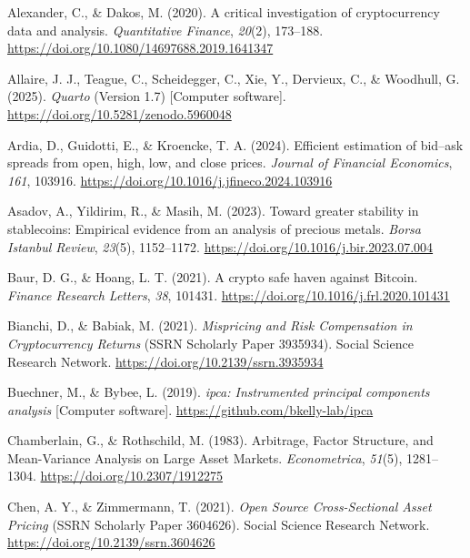 \documentclass[
  12pt,
  a4paper,
  openany]{scrbook}
\newlength{\cslhangindent}
\newenvironment{CSLReferences}[2] %
 {\begin{list}{}{%
  \setlength{\itemindent}{0pt}
  \setlength{\leftmargin}{0pt}
  \setlength{\parsep}{0pt}
  \ifodd #1
   \setlength{\leftmargin}{\cslhangindent}
   \setlength{\itemindent}{-1\cslhangindent}
  \fi
  \setlength{\itemsep}{#2\baselineskip}}}
 {\end{list}}
\begin{document}
\label{refs}
\begin{CSLReferences}{1}{0}
Alexander, C., \& Dakos, M. (2020). A critical investigation of
cryptocurrency data and analysis. \emph{Quantitative Finance},
\emph{20}(2), 173--188.
\url{https://doi.org/10.1080/14697688.2019.1641347}

Allaire, J. J., Teague, C., Scheidegger, C., Xie, Y., Dervieux, C., \&
Woodhull, G. (2025). \emph{{Quarto}} (Version 1.7) {[}Computer
software{]}. \url{https://doi.org/10.5281/zenodo.5960048}

Ardia, D., Guidotti, E., \& Kroencke, T. A. (2024). Efficient estimation
of bid--ask spreads from open, high, low, and close prices.
\emph{Journal of Financial Economics}, \emph{161}, 103916.
\url{https://doi.org/10.1016/j.jfineco.2024.103916}

Asadov, A., Yildirim, R., \& Masih, M. (2023). Toward greater stability
in stablecoins: Empirical evidence from an analysis of precious metals.
\emph{Borsa Istanbul Review}, \emph{23}(5), 1152--1172.
\url{https://doi.org/10.1016/j.bir.2023.07.004}

Baur, D. G., \& Hoang, L. T. (2021). A crypto safe haven against
Bitcoin. \emph{Finance Research Letters}, \emph{38}, 101431.
\url{https://doi.org/10.1016/j.frl.2020.101431}

Bianchi, D., \& Babiak, M. (2021). \emph{Mispricing and Risk
Compensation in Cryptocurrency Returns} (SSRN Scholarly Paper 3935934).
Social Science Research Network.
\url{https://doi.org/10.2139/ssrn.3935934}

Buechner, M., \& Bybee, L. (2019). \emph{{ipca}: Instrumented principal
components analysis} {[}Computer software{]}.
\url{https://github.com/bkelly-lab/ipca}

Chamberlain, G., \& Rothschild, M. (1983). Arbitrage, Factor Structure,
and Mean-Variance Analysis on Large Asset Markets. \emph{Econometrica},
\emph{51}(5), 1281--1304. \url{https://doi.org/10.2307/1912275}

Chen, A. Y., \& Zimmermann, T. (2021). \emph{Open Source Cross-Sectional
Asset Pricing} (SSRN Scholarly Paper 3604626). Social Science Research
Network. \url{https://doi.org/10.2139/ssrn.3604626}


\end{CSLReferences}
\end{document}
